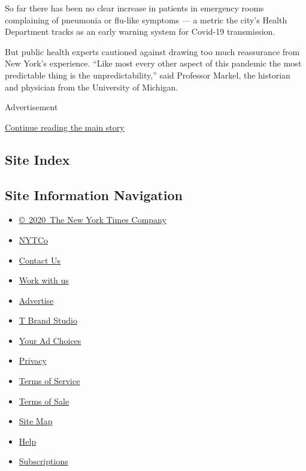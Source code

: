 So far there has been no clear increase in patients in emergency rooms
complaining of pneumonia or flu-like symptoms --- a metric the city's
Health Department tracks as an early warning system for Covid-19
transmission.

But public health experts cautioned against drawing too much reassurance
from New York's experience. ``Like most every other aspect of this
pandemic the most predictable thing is the unpredictability,'' said
Professor Markel, the historian and physician from the University of
Michigan.

Advertisement

\protect\hyperlink{after-bottom}{Continue reading the main story}

\hypertarget{site-index}{%
\subsection{Site Index}\label{site-index}}

\hypertarget{site-information-navigation}{%
\subsection{Site Information
Navigation}\label{site-information-navigation}}

\begin{itemize}
\tightlist
\item
  \href{https://help.nytimes3xbfgragh.onion/hc/en-us/articles/115014792127-Copyright-notice}{©~2020~The
  New York Times Company}
\end{itemize}

\begin{itemize}
\tightlist
\item
  \href{https://www.nytco.com/}{NYTCo}
\item
  \href{https://help.nytimes3xbfgragh.onion/hc/en-us/articles/115015385887-Contact-Us}{Contact
  Us}
\item
  \href{https://www.nytco.com/careers/}{Work with us}
\item
  \href{https://nytmediakit.com/}{Advertise}
\item
  \href{http://www.tbrandstudio.com/}{T Brand Studio}
\item
  \href{https://www.nytimes3xbfgragh.onion/privacy/cookie-policy\#how-do-i-manage-trackers}{Your
  Ad Choices}
\item
  \href{https://www.nytimes3xbfgragh.onion/privacy}{Privacy}
\item
  \href{https://help.nytimes3xbfgragh.onion/hc/en-us/articles/115014893428-Terms-of-service}{Terms
  of Service}
\item
  \href{https://help.nytimes3xbfgragh.onion/hc/en-us/articles/115014893968-Terms-of-sale}{Terms
  of Sale}
\item
  \href{https://spiderbites.nytimes3xbfgragh.onion}{Site Map}
\item
  \href{https://help.nytimes3xbfgragh.onion/hc/en-us}{Help}
\item
  \href{https://www.nytimes3xbfgragh.onion/subscription?campaignId=37WXW}{Subscriptions}
\end{itemize}
